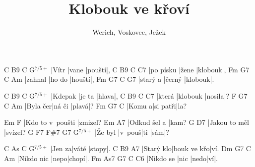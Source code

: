 \documentclass{song}
\title{Klobouk ve křoví}
\author{Werich, Voskovec, Ježek}
\newcommand{\aug}{$^{7/5+}$}
\begin{document}
\strophe
C     B9   C      G\aug
|Vítr |vane |pouští|,
C         B9   C       C7
|po písku |žene |klobouk|,
Fm      G7    C      Am
|zahnal |ho do |houští|,
Fm       G7     C       G7
|starý a |černý |klobouk|.
\endstrophe

\strophe
C       B9     C     G\aug
|Kdepak |je ta |hlava|,
C      B9       C      C7
|která |klobouk |nosila|?
F        G7     C     Am
|Byla čer|ná či |plavá|?
Fm     G7       C
|Komu a|si patři|la?
\endstrophe

\strophe
Em               F
|Kdo to v~poušti |zmizel?
Em           A7
|Odkud šel a |kam?
G             D7
|Jakou to měl |svízel?
G       F7     F\#7  G7 G\aug
|Že byl |v~pouš|ti   |sám|?
\endstrophe

\strophe
C      As    C     G\aug
|Jen za|váté |stopy|.
C         B9         A7
|Starý klo|bouk ve křo|ví.
Dm         G7   C     Am
|Nikdo nic |nepo|chopí|.
Fm        As7  G7  C   C6
|Nikdo se |nic |nedo|ví|.
\endstrophe

\end{document}
